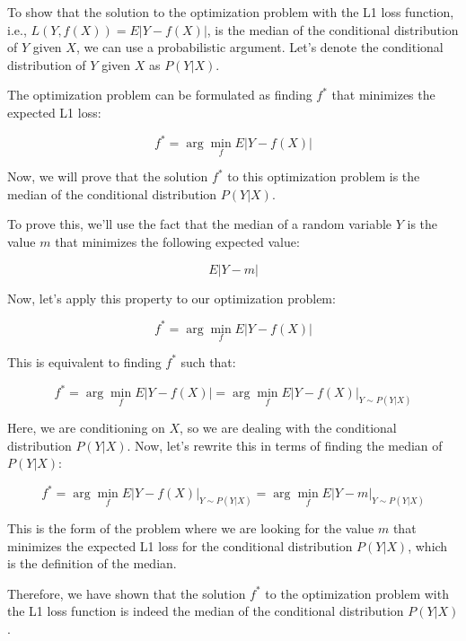 To show that the solution to the optimization problem with the L1 loss function, i.e., $L(Y, f(X)) = E|Y - f(X)|$, is the median of the conditional distribution of $Y$ given $X$, we can use a probabilistic argument. Let's denote the conditional distribution of $Y$ given $X$ as $P(Y|X)$.

The optimization problem can be formulated as finding $f^*$ that minimizes the expected L1 loss:

\[
f^* = \arg\min_f E|Y - f(X)|
\]

Now, we will prove that the solution $f^*$ to this optimization problem is the median of the conditional distribution $P(Y|X)$.

To prove this, we'll use the fact that the median of a random variable $Y$ is the value $m$ that minimizes the following expected value:

\[
E|Y - m|
\]

Now, let's apply this property to our optimization problem:

\[
f^* = \arg\min_f E|Y - f(X)|
\]

This is equivalent to finding $f^*$ such that:

\[
f^* = \arg\min_f E|Y - f(X)| = \arg\min_f E|Y - f(X)|_{Y \sim P(Y|X)}
\]

Here, we are conditioning on $X$, so we are dealing with the conditional distribution $P(Y|X)$. Now, let's rewrite this in terms of finding the median of $P(Y|X)$:

\[
f^* = \arg\min_f E|Y - f(X)|_{Y \sim P(Y|X)} = \arg\min_f E|Y - m|_{Y \sim P(Y|X)}
\]

This is the form of the problem where we are looking for the value $m$ that minimizes the expected L1 loss for the conditional distribution $P(Y|X)$, which is the definition of the median.

Therefore, we have shown that the solution $f^*$ to the optimization problem with the L1 loss function is indeed the median of the conditional distribution $P(Y|X)$.

